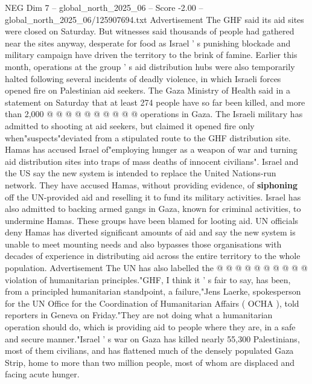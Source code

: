 \begin{textsample}{NEG Dim 7 – global\_north\_2025\_06 – Score -2.00 – global\_north\_2025\_06/125907694.txt}
Advertisement The GHF said its aid sites were closed on Saturday.
But witnesses said thousands of people had gathered near the sites anyway, desperate for food as Israel ' s punishing blockade and military campaign have driven the territory to the brink of famine.
Earlier this month, operations at the group ' s aid distribution hubs were also temporarily halted following several incidents of deadly violence, in which Israeli forces opened fire on Palestinian aid seekers.
The Gaza Ministry of Health said in a statement on Saturday that at least 274 people have so far been killed, and more than 2,000 @ @ @ @ @ @ @ @ @ @ operations in Gaza.
The Israeli military has admitted to shooting at aid seekers, but claimed it opened fire only when"suspects"deviated from a stipulated route to the GHF distribution site.
Hamas has accused Israel of"employing hunger as a weapon of war and turning aid distribution sites into traps of mass deaths of innocent civilians".
Israel and the US say the new system is intended to replace the United Nations-run network.
They have accused Hamas, without providing evidence, of \textbf{siphoning} off the UN-provided aid and reselling it to fund its military activities.
Israel has also admitted to backing armed gangs in Gaza, known for criminal activities, to undermine Hamas.
These groups have been blamed for looting aid.
UN officials deny Hamas has diverted significant amounts of aid and say the new system is unable to meet mounting needs and also bypasses those organisations with decades of experience in distributing aid across the entire territory to the whole population.
Advertisement The UN has also labelled the @ @ @ @ @ @ @ @ @ @ violation of humanitarian principles."GHF, I think it ' s fair to say, has been, from a principled humanitarian standpoint, a failure,"Jens Laerke, spokesperson for the UN Office for the Coordination of Humanitarian Affairs ( OCHA ), told reporters in Geneva on Friday."They are not doing what a humanitarian operation should do, which is providing aid to people where they are, in a safe and secure manner."Israel ' s war on Gaza has killed nearly 55,300 Palestinians, most of them civilians, and has flattened much of the densely populated Gaza Strip, home to more than two million people, most of whom are displaced and facing acute hunger.

\end{textsample}
